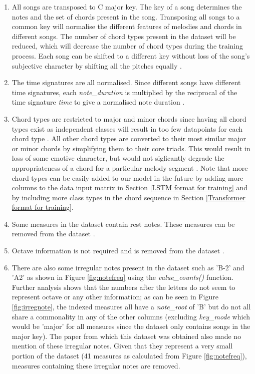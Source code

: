 \begin{enumerate}
  \item All songs are transposed to C major key. The key of a song determines the notes and the set of chords present in the song. Transposing all songs to a common key will normalise the different features of melodies and chords in different songs. The number of chord types present in the dataset will be reduced, which will decrease the number of chord types during the training process. Each song can be shifted to a different key without loss of the song's subjective character by shifting all the pitches equally \cite{MySong} \cite{MLForChords} \cite{BLSTM}.
  \item The time signatures are all normalised. Since different songs have different time signatures, each \emph{note\_duration} is multiplied by the reciprocal of the time signature \emph{time} to give a normalised note duration \cite{BLSTM}.
  \item Chord types are restricted to major and minor chords since having all chord types exist as independent classes will result in too few datapoints for each chord type \cite{BLSTM}. All other chord types are converted to their most similar major or minor chords by simplifying them to their core triads. This would result in loss of some emotive character, but would not sigficantly degrade the appropriateness of a chord for a particular melody segment \cite{MySong}. Note that more chord types can be easily added to our model in the future by adding more columns to the data input matrix in Section \ref{LSTM format for training} and by including more class types in the chord sequence in Section \ref{Transformer format for training}.
  \item Some measures in the dataset contain rest notes. These measures can be removed from the dataset \cite{MLForChords}.
  \item Octave information is not required and is removed from the dataset \cite{BLSTM}.
  \item There are also some irregular notes present in the dataset such as 'B-2' and 'A2' as shown in Figure \ref{fig:notefreq} using the \emph{value\_counts()} function. Further analysis shows that the numbers after the letters do not seem to represent octave or any other information; as can be seen in Figure \ref{fig:irregnote}, the indexed measures all have a \emph{note\_root} of 'B' but do not all share a commonality in any of the other columns (excluding \emph{key\_mode} which would be 'major' for all measures since the dataset only contains songs in the major key). The paper from which this dataset was obtained also made no mention of these irregular notes. Given that they represent a very small portion of the dataset (41 measures as calculated from Figure \ref{fig:notefreq}), measures containing these irregular notes are removed.
\end{enumerate}

